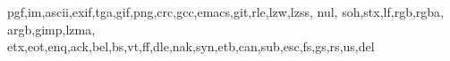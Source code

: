 \newcommand{\firstcharnode}[3]{  \node (#1) [hnode] {#2};
  \nodechar{#1}{#3}}

\newcommand{\restcharnode}[4]{
  \node (#1) [hnode,right=of #2] {#3};
  \nodechar{#1}{#4}
}

\newcommand*\algohack{\addtocontents{loa}{\vskip 9pt}}


\newcommand*\acronymstyle{\scshape}
\newcommand*\newacronym[1]{
  \expandafter\newcommand\csname#1\endcsname[1][]{{\acronymstyle#1}##1\xspace}}

\newcommand*{\newacronyms}{%
  \let\do\newacronym
  \docsvlist
}
\newacronyms{pgf,im,ascii,exif,tga,gif,png,crc,gcc,emacs,git,rle,lzw,lzss,
nul, soh,stx,lf,rgb,rgba, argb,gimp,lzma,
etx,eot,enq,ack,bel,bs,vt,ff,dle,nak,syn,etb,can,sub,esc,fs,gs,rs,us,del}

\newcommand*{\lzone}{{\acronymstyle lz\oldstylenums{77}}\xspace}
\newcommand*{\lztwo}{{\acronymstyle lz\oldstylenums{78}}\xspace}

\newcommand*{\cret}{{\acronymstyle cr}\xspace}
\newcommand*{\htab}{{\acronymstyle ht}\xspace}
\newcommand*{\nullm}{{\acronymstyle null}\xspace}
\newcommand*{\lzfam}{{\acronymstyle lz}-family\xspace}
\newcommand*{\sout}{{\acronymstyle so}\xspace}
\newcommand*{\shiftin}{{\acronymstyle si}\xspace}
\newcommand*{\emed}{{\acronymstyle em}\xspace}

\newcommand*{\crlf}{{\acronymstyle crlf}\xspace}


\newcommand*{\dc}[1]{{\acronymstyle dc#1}\xspace}


\newcommand*{\crcst}{{\acronymstyle crc-16}\xspace}

\newcommand{\deflate}{Deflate\xspace}

\newenvironment{samepagew}{\begin{minipage}{\textwidth}}{\end{minipage}}


